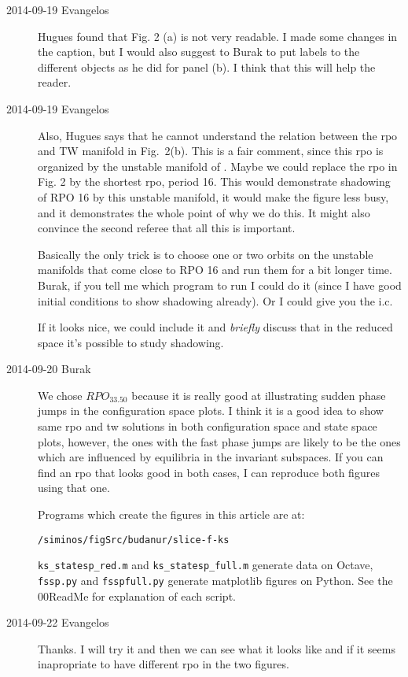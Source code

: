 \begin{description}
\item[2014-09-19 Evangelos] Hugues found that Fig. 2 (a) is not very readable. I made some changes in the caption, but I would also
suggest to Burak to put labels to the different objects as he did for panel (b). I think that this will help the reader.

\item[2014-09-19 Evangelos] Also, Hugues says that he cannot understand
the relation between the rpo and TW manifold in Fig.~2(b). This is a fair
comment, since this rpo is organized by the unstable manifold of .
Maybe we could replace the rpo in Fig. 2 by the shortest rpo, period 16.
This would demonstrate shadowing of RPO 16 by this unstable manifold, it
would make the figure less busy, and it demonstrates the whole point of
why we do this. It might also convince the second referee that all this
is important.

Basically the only trick is to choose one or two orbits on the unstable manifolds that come close to RPO 16 and run them for a bit
longer time. Burak, if you tell me which program to run I could do it (since I have good initial conditions to show shadowing already).
Or I could give you the i.c.

If it looks nice, we could include it and \emph{briefly} discuss that in the reduced space it's possible to study shadowing.

\item[2014-09-20 Burak] We chose $RPO_{33.50}$ because it is really good at illustrating
sudden phase jumps in the configuration space plots. I think it is a good idea to show
same rpo and tw solutions in both configuration space and state space plots, however,
the ones with the fast phase jumps are likely to be the ones which are influenced by
equilibria in the invariant subspaces. If you can find an rpo that looks good in both
cases, I can reproduce both figures using that one.

Programs which create the figures in this article are at:

\texttt{/siminos/figSrc/budanur/slice-f-ks}

\texttt{ks\_statesp\_red.m} and \texttt{ks\_statesp\_full.m} generate data on Octave,
\texttt{fssp.py} and \texttt{fsspfull.py} generate matplotlib figures on Python.
See the 00ReadMe for explanation of each script.

\item[2014-09-22 Evangelos] Thanks. I will try it and then we can see what it looks like
and if it seems inapropriate to have different rpo in the two figures.


\end{description}
